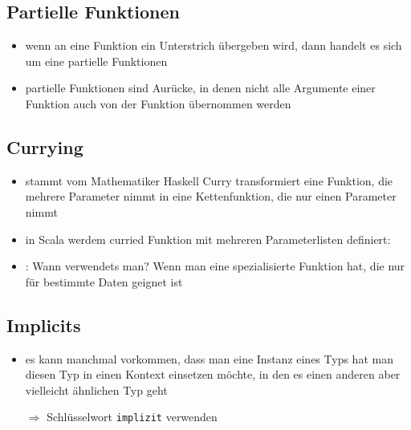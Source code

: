 \subsection{Partielle Funktionen}
\begin{itemize}
  \item wenn an eine Funktion ein Unterstrich übergeben wird, dann handelt
  es sich um eine partielle Funktionen
  \item partielle Funktionen sind Aurücke, in denen nicht alle Argumente 
  einer Funktion auch von der Funktion übernommen werden
  
    
\end{itemize}


\subsection{Currying}
\begin{itemize}
  \item stammt vom Mathematiker Haskell Curry \und transformiert eine Funktion, die mehrere Parameter nimmt in eine Kettenfunktion, die nur einen
  Parameter nimmt
  \item in Scala werdem curried Funktion mit mehreren Parameterlisten
  definiert:
  
  
  
  \item {}: Wann verwendets man? Wenn man eine spezialisierte
  Funktion hat, die nur für bestimmte Daten geignet ist
\end{itemize}


\subsection{Implicits}
\begin{itemize}
  \item es kann manchmal vorkommen, dass man eine Instanz eines Typs hat 
  \und man diesen Typ in einen Kontext einsetzen möchte, in den es einen
  anderen aber vielleicht ähnlichen Typ geht
  
  $\Rightarrow$ Schlüsselwort \texttt{implizit} verwenden
  
    
\end{itemize}


